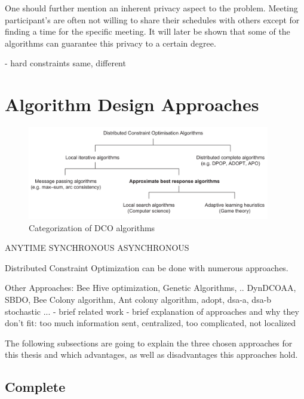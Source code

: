 One should further mention an inherent privacy aspect to the problem. Meeting participant's are often not willing to share their schedules with others except for finding a time for the specific meeting. It will later be shown that some of the algorithms can guarantee this privacy to a certain degree.
    
    
   \cite{Berger2008}
   \cite{BenHassine2007}
   \cite{Grubshtein}
   
   - hard constraints same, different
    

\section{Algorithm Design Approaches}

\begin{figure}[h]
\includegraphics[width=400px]{graphics/overview_algos}
\caption{Categorization of DCO algorithms \cite{Chapman2011}}
\end{figure}

ANYTIME
SYNCHRONOUS
ASYNCHRONOUS


Distributed Constraint Optimization can be done with numerous approaches.

Other Approaches: Bee Hive optimization, Genetic Algorithms, .. DynDCOAA, SBDO, Bee Colony algorithm, Ant colony algorithm, adopt, dsa-a, dsa-b stochastic ...
    - brief related work
    - brief explanation of approaches and why they don't fit: too much information sent, centralized, too complicated, not localized
    
    The following subsections are going to explain the three chosen approaches for this thesis and which advantages, as well as disadvantages this approaches hold.
    
    \cite{Likhachev}
    
\subsection{Complete}

